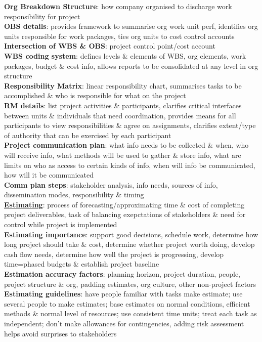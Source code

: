\documentclass[a4paper]{article}
\begin{document}
\begin{multicols}{3}
        \textbf{Org Breakdown Structure}: how company organised to discharge work responsibility for project\\
        \textbf{OBS details}: provides framework to summarise org work unit perf, identifies org units responsible for work packages, ties org units to cost control accounts\\
        \textbf{Intersection of WBS \& OBS}: project control point/cost account\\
        \textbf{WBS coding system}: defines levels \& elements of WBS, org elements, work packages, budget \& cost info, allows reports to be consolidated at any level in org structure\\
        \textbf{Responsibility Matrix}: linear responsibility chart, summarises tasks to be accomplished \& who is responsible for what on the project\\
        \textbf{RM details}: list project activities \& participants, clarifies critical interfaces between units \& individuals that need coordination, provides means for all participants to view responsibilities \& agree on assignments, clarifies extent/type of authority that can be exercised by each participant\\
        \textbf{Project communication plan}: what info needs to be collected \& when, who will receive info, what methods will be used to gather \& store info, what are limits on who as access to certain kinds of info, when will info be communicated, how will it be communicated\\
        \textbf{Comm plan steps}: stakeholder analysis, info needs, sources of info, dissemination modes, responsibility \& timing\\
        \underline{\textbf{Estimating}}: process of forecasting/approximating time \& cost of completing project deliverables, task of balancing exepctations of stakeholders \& need for control while project is implemented\\
        \textbf{Estimating importance}: support good decisions, schedule work, determine how long project should take \& cost, determine whether project worth doing, develop cash flow needs, determine how well the project is progressing, develop time=phased budgets \& establish project baseline\\
        \textbf{Estimation accuracy factors}: planning horizon, project duration, people, project structure \& org, padding estimates, org culture, other non-project factors\\
        \textbf{Estimating guidelines}: have people familiar with tasks make estimate; use several people to make estimates; base estimates on normal conditions, efficient methods \& normal level of resources; use consistent time units; treat each task as independent; don't make allowances for contingencies, adding risk assessment helps avoid surprises to stakeholders\\

\end{multicols}
\end{document}
